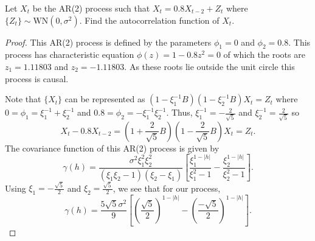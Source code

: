 \documentclass[12pt]{article}
\theoremstyle{definition}
\newenvironment{custompbm}[1]
  {\renewcommand\theproblem{#1}\problem}
  {\endproblem}
\begin{document}
\begin{custompbm}{2.a}
  Let $X_t$ be the AR(2) process such that $X_t = 0.8X_{t-2} + Z_t$ where $\{Z_t\}\sim \text{WN}(0, \sigma^2)$.
  Find the autocorrelation function of $X_t$.
\end{custompbm}

\begin{proof}
  This AR(2) process is defined by the parameters $\phi_1 = 0$ and $\phi_2 = 0.8$.
  This process has characteristic equation $\phi(z) = 1 - 0.8z^2 = 0$ of which
  the roots are $z_1 = 1.11803$ and $z_2 = -1.11803$. As these roots lie outside the unit
  circle this process is causal.

  Note that $\{X_t\}$ can be represented as $(1 - \xi_1^{-1}B)(1 - \xi_2^{-1}B)X_t = Z_t$ where
  $0 = \phi_1 = \xi_1^{-1} + \xi_2^{-1}$ and $0.8 = \phi_2 =-\xi_1^{-1} \xi_2^{-1}$. Thus,
  $\xi_1^{-1} = - \frac{2}{\sqrt{5}}$ and $\xi_2^{-1} = \frac{2}{\sqrt{5}}$ so
  \[
    X_t - 0.8 X_{t-2} = \left(1 + \frac{2}{\sqrt{5}}B\right)\left(1 - \frac{2}{\sqrt{5}}B\right)X_t = Z_t.
  \]
  The covariance function of this AR(2) process is given by
  \[
    \gamma(h) = \frac{\sigma^2 \xi_1^2 \xi_2^2}{(\xi_1 \xi_2 - 1)(\xi_2 - \xi_1)}\left[\frac{\xi_1^{1-|h|}}{\xi_1^2 - 1} - \frac{\xi_2^{1-|h|}}{\xi_2^2 - 1}\right].
  \]
  Using $\xi_1 = -\frac{\sqrt{5}}{2} $ and $\xi_2 = \frac{\sqrt{5}}{2}$, we see that for our process,
  \[
    \gamma(h) = \frac{5\sqrt{5}\sigma^2}{9}\left[\left(\frac{\sqrt{5}}{2}\right)^{1-|h|} - \left(\frac{-\sqrt{5}}{2}\right)^{1-|h|}\right].
  \]
\end{proof}
\end{document}
